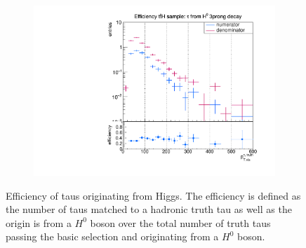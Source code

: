 \begin{figure}
\begin{subfigure}[t]{0.49\textwidth}
                \label{DividedFromH:bg:1prong}
                \end{subfigure}
                \begin{subfigure}[t]{0.49\textwidth}
                \includegraphics[width=\textwidth]{figures/plots/ttH/Divided_fromH3prong.pdf}
                \label{DividedFromH:bg:3prong}
                \end{subfigure}
\caption[Efficiency of taus originating from Higgs bosons.]{Efficiency of taus originating from Higgs. The efficiency is defined as the number of taus matched to a hadronic truth tau as well as the origin is from a $H^0$ boson over the total number of truth taus passing the basic selection and originating from a $H^0$ boson.}
\label{DividedFromH:bg:ttH}
\end{figure}
%
